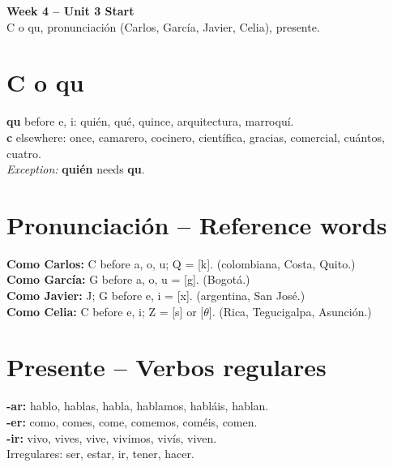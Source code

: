 \documentclass[10pt,a4paper]{article}
\begin{document}
\begin{center}
{\large\bfseries\color{w4brown} Week 4 -- Unit 3 Start}\\[0.2em]
\footnotesize C o qu, pronunciaci\'on (Carlos, Garc\'ia, Javier, Celia), presente.
\end{center}\vspace{0.5em}

\section*{\color{w4brown}C o qu}
\textbf{qu} before e, i: qui\'en, qu\'e, quince, arquitectura, marroqu\'i. \\
\textbf{c} elsewhere: once, camarero, cocinero, cient\'ifica, gracias, comercial, cu\'antos, cuatro. \\
\textit{Exception:} \textbf{qui\'en} needs \textbf{qu}.

\section*{\color{w4brown}Pronunciaci\'on -- Reference words}
\textbf{Como Carlos:} C before a, o, u; Q = [k]. (colombiana, Costa, Quito.) \\
\textbf{Como Garc\'ia:} G before a, o, u = [g]. (Bogot\'a.) \\
\textbf{Como Javier:} J; G before e, i = [x]. (argentina, San Jos\'e.) \\
\textbf{Como Celia:} C before e, i; Z = [s] or [$\theta$]. (Rica, Tegucigalpa, Asunci\'on.)

\section*{\color{w4brown}Presente -- Verbos regulares}
\textbf{-ar:} hablo, hablas, habla, hablamos, habl\'ais, hablan. \\
\textbf{-er:} como, comes, come, comemos, com\'eis, comen. \\
\textbf{-ir:} vivo, vives, vive, vivimos, viv\'is, viven. \\
Irregulares: ser, estar, ir, tener, hacer.
\end{document}
